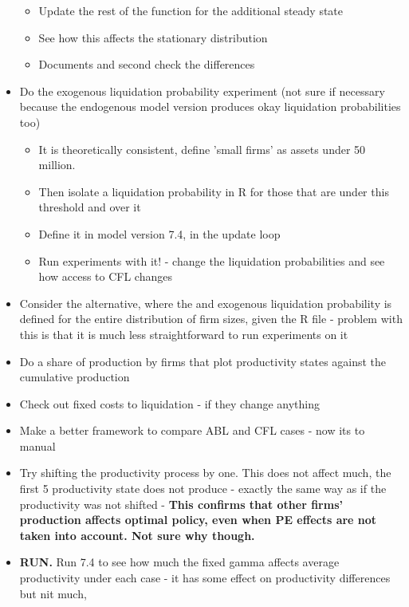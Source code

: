 \documentclass[12pt]{article}
\begin{document}
\begin{itemize}
\begin{itemize}
        \item Update the rest of the function for the additional steady state  \checkmark
        \item See how this affects the stationary distribution \checkmark
        \item Documents and second check the differences  \checkmark
    \end{itemize}
    \item Do the exogenous liquidation probability experiment (not sure if necessary because the endogenous model version produces okay liquidation probabilities too) \checkmark
        \begin{itemize}
            \item It is theoretically consistent, define 'small firms' as assets under 50 million. \checkmark
            \item Then isolate a liquidation probability in R for those that are under this threshold and over it  \checkmark
            \item Define it in model version 7.4, in the update loop \checkmark
            \item Run experiments with it! - change the liquidation probabilities and see how access to CFL changes \checkmark
        \end{itemize}
    \item Consider the alternative, where the and exogenous liquidation probability is defined for the entire distribution of firm sizes, given the R file - problem with this is that it is much less straightforward to run experiments on it \checkmark
    \item Do a share of production by firms that plot productivity states against the cumulative production \checkmark
    \item Check out fixed costs to liquidation - if they change anything \checkmark
    \item Make a better framework to compare ABL and CFL cases - now its to manual  \checkmark
    \item Try shifting the productivity process by one. This does not affect much, the first 5 productivity state does not produce - exactly the same way as if the productivity was not shifted - \textbf{This confirms that other firms' production affects optimal policy, even when PE effects are not taken into account. Not sure why though.} \checkmark
    \item \textbf{RUN.} Run 7.4 to see how much the fixed gamma affects average productivity under each case - it has some effect on productivity differences but nit much, \checkmark

\end{itemize}
\end{document}
